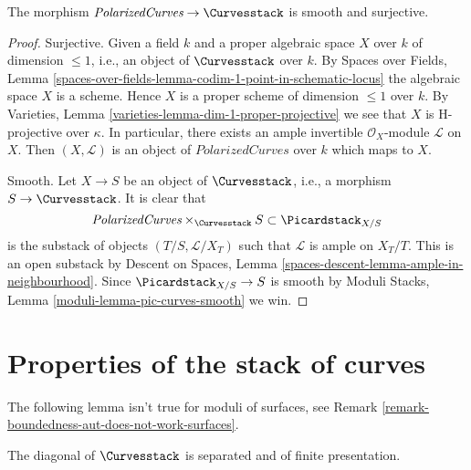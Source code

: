 \begin{lemma}
\label{lemma-polarized-curves-over-curves}
The morphism
$\textit{PolarizedCurves} \to \Curvesstack$
is smooth and surjective.
\end{lemma}

\begin{proof}
Surjective. Given a field $k$ and a proper algebraic space
$X$ over $k$ of dimension $\leq 1$, i.e., an object of $\Curvesstack$ over $k$.
By Spaces over Fields, Lemma
\ref{spaces-over-fields-lemma-codim-1-point-in-schematic-locus}
the algebraic space $X$ is a scheme. Hence $X$
is a proper scheme of dimension $\leq 1$ over $k$.
By Varieties, Lemma \ref{varieties-lemma-dim-1-proper-projective}
we see that $X$ is H-projective over $\kappa$.
In particular, there exists an ample invertible $\mathcal{O}_X$-module
$\mathcal{L}$ on $X$. Then $(X, \mathcal{L})$ is an object
of $\textit{PolarizedCurves}$ over
$k$ which maps to $X$.

\medskip\noindent
Smooth. Let $X \to S$ be an object of $\Curvesstack$, i.e., a
morphism $S \to \Curvesstack$. It is clear that
$$
\textit{PolarizedCurves}
\times_{\Curvesstack} S
\subset \Picardstack_{X/S}
$$
is the substack of objects $(T/S, \mathcal{L}/X_T)$ such that
$\mathcal{L}$ is ample on $X_T/T$. This is an open substack by
Descent on Spaces, Lemma \ref{spaces-descent-lemma-ample-in-neighbourhood}.
Since $\Picardstack_{X/S} \to S$ is smooth by
Moduli Stacks, Lemma \ref{moduli-lemma-pic-curves-smooth}
we win.
\end{proof}






\section{Properties of the stack of curves}
\label{section-properties}

\noindent
The following lemma isn't true for moduli of surfaces, see
Remark \ref{remark-boundedness-aut-does-not-work-surfaces}.

\begin{lemma}
\label{lemma-curves-diagonal-separated-fp}
The diagonal of $\Curvesstack$ is separated
and of finite presentation.
\end{lemma}

